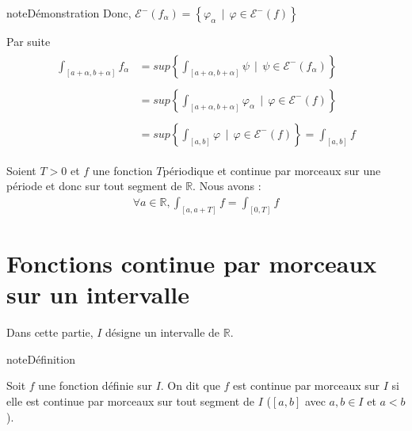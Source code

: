 \documentclass[letterpaper,10pt,french]{jupyterBook}
\begin{document}
\begin{sphinxadmonition}{note}{Démonstration}
\sphinxAtStartPar
Donc, \(\mathcal E^-(f_\alpha)= \left\{\varphi_\alpha ~~ | ~~ \varphi \in \mathcal E^-(f) \right\}\)

\sphinxAtStartPar
Par suite
\begin{equation*}
\begin{split}
\begin{aligned}
\int_{[a+\alpha, b+\alpha]} f_{\alpha} &= sup \left\{\int_{[a+\alpha, b+\alpha]} \psi ~~| ~~ \psi \in \mathcal E^-(f_\alpha) \right\} \\ \\
&= sup \left\{\int_{[a+\alpha, b+\alpha]} \varphi_\alpha ~~| ~~ \varphi \in \mathcal E^-(f) \right\} \\ \\
&= sup \left\{\int_{[a, b]} \varphi ~~| ~~ \varphi \in \mathcal E^-(f) \right\} = \int_{[a, b]} f
\end{aligned}
\end{split}
\end{equation*}\end{sphinxadmonition}

\sphinxAtStartPar
Soient \(T>0\) et \(f\) une fonction \(T\)\sphinxhyphen{}périodique et continue par morceaux sur une période et donc sur tout segment de \(\mathbb R\). Nous avons :
\begin{equation*}
\begin{split}
\forall a \in \mathbb R, \int_{[a, a+ T]} f = \int_{[0, T]}f
\end{split}
\end{equation*}

\section{Fonctions continue par morceaux sur un intervalle}
\label{\detokenize{fcmint:fonctions-continue-par-morceaux-sur-un-intervalle}}\label{\detokenize{fcmint::doc}}
\sphinxAtStartPar
Dans cette partie, \(I\) désigne un intervalle de \(\mathbb R\).

\begin{sphinxadmonition}{note}{Définition}

\sphinxAtStartPar
Soit \(f\) une fonction définie sur \(I\). On dit que \(f\) est continue par morceaux sur \(I\) si elle est continue par morceaux sur tout segment de \(I\) (\([a, b]\) avec \(a, b \in I\) et \(a<b\)).
\end{sphinxadmonition}
\end{document}
